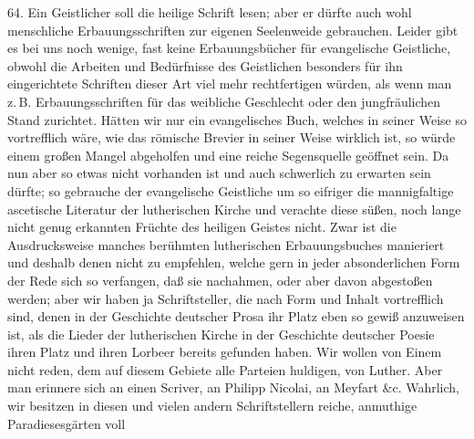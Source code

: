 64. Ein Geistlicher soll die heilige Schrift lesen; aber er dürfte auch wohl menschliche Erbauungsschriften zur
eigenen Seelenweide gebrauchen. Leider gibt es bei uns noch wenige, fast keine Erbauungsbücher für evangelische Geistliche, obwohl die Arbeiten und Bedürfnisse des Geistlichen besonders für ihn eingerichtete Schriften dieser Art viel mehr rechtfertigen würden, als wenn man z.\,B. Erbauungsschriften für das weibliche Geschlecht oder den jungfräulichen Stand zurichtet. Hätten wir nur ein evangelisches Buch, welches in seiner Weise so vortrefflich wäre, wie das römische Brevier in seiner Weise wirklich ist, so würde einem großen Mangel abgeholfen und eine reiche Segensquelle geöffnet sein. Da nun aber so etwas nicht vorhanden ist und auch schwerlich zu erwarten sein dürfte; so gebrauche der evangelische Geistliche um so eifriger die mannigfaltige ascetische Literatur der lutherischen Kirche und verachte diese süßen, noch lange nicht genug erkannten Früchte des heiligen Geistes nicht. Zwar ist die Ausdrucksweise manches berühmten lutherischen Erbauungsbuches manieriert und deshalb denen nicht zu empfehlen, welche gern in jeder absonderlichen Form der Rede sich so verfangen, daß sie nachahmen, oder aber davon abgestoßen werden; aber wir haben ja Schriftsteller, die nach Form und Inhalt vortrefflich sind, denen in der Geschichte deutscher Prosa ihr Platz eben so gewiß anzuweisen ist, als die Lieder der lutherischen Kirche in der Geschichte deutscher Poesie ihren Platz und ihren Lorbeer bereits gefunden haben. Wir wollen von Einem nicht reden, dem auf diesem Gebiete alle Parteien huldigen, von Luther. Aber man erinnere sich an einen Scriver, an Philipp Nicolai, an Meyfart \&c. Wahrlich, wir besitzen in diesen und vielen andern Schriftstellern reiche, anmuthige Paradiesesgärten voll
